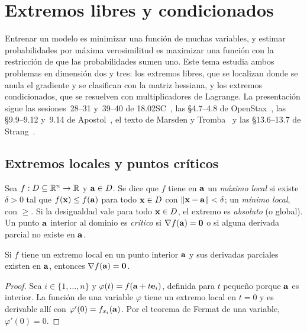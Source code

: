 \chapter{Extremos libres y condicionados}
\label{tema:5}

Entrenar un modelo es minimizar una función de muchas variables, y estimar probabilidades por máxima verosimilitud es maximizar una función con la restricción de que las probabilidades sumen uno. Este tema estudia ambos problemas en dimensión dos y tres: los extremos libres, que se localizan donde se anula el gradiente y se clasifican con la matriz hessiana, y los extremos condicionados, que se resuelven con multiplicadores de Lagrange. La presentación sigue las sesiones~28--31 y~39--40 de 18.02SC~\cite{mit1802}, las §4.7--4.8 de OpenStax~\cite{openstax3}, las §9.9--9.12 y~9.14 de Apostol~\cite{apostol2}, el texto de Marsden y Tromba~\cite{marsden} y las §13.6--13.7 de Strang~\cite{strangcalc}.

\section{Extremos locales y puntos críticos}

\begin{definicion}[Extremos]\label{def:extremos}
Sea $f:D\subseteq\mathbb{R}^n\to\mathbb{R}$ y $\mathbf{a}\in D$. Se dice que $f$ tiene en $\mathbf{a}$ un \emph{máximo local} si existe $\delta>0$ tal que $f(\mathbf{x})\le f(\mathbf{a})$ para todo $\mathbf{x}\in D$ con $\lVert\mathbf{x}-\mathbf{a}\rVert<\delta$; un \emph{mínimo local}, con $\ge$. Si la desigualdad vale para todo $\mathbf{x}\in D$, el extremo es \emph{absoluto} (o global). Un punto $\mathbf{a}$ interior al dominio es \emph{crítico} si $\nabla f(\mathbf{a})=\mathbf{0}$ o si alguna derivada parcial no existe en $\mathbf{a}$.
\end{definicion}

\begin{teorema}\label{teo:fermat}
Si $f$ tiene un extremo local en un punto interior $\mathbf{a}$ y sus derivadas parciales existen en $\mathbf{a}$, entonces $\nabla f(\mathbf{a})=\mathbf{0}$.
\end{teorema}

\begin{proof}
Sea $i\in\{1,\dots,n\}$ y $\varphi(t)=f(\mathbf{a}+t\mathbf e_i)$, definida para $t$ pequeño porque $\mathbf{a}$ es interior. La función de una variable $\varphi$ tiene un extremo local en $t=0$ y es derivable allí con $\varphi'(0)=f_{x_i}(\mathbf{a})$. Por el teorema de Fermat de una variable, $\varphi'(0)=0$.
\end{proof}

